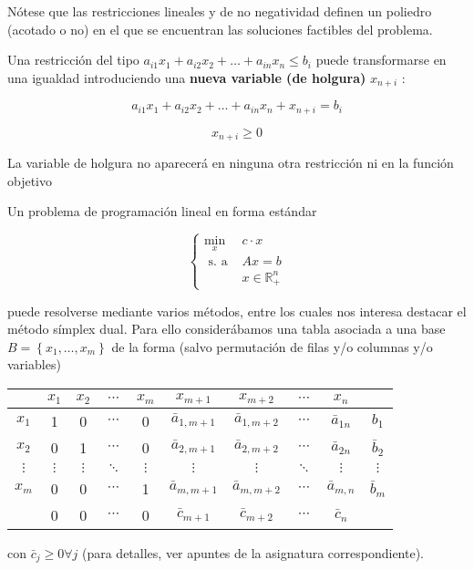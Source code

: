 \documentclass[openany]{book}
\begin{document}
Nótese que las restricciones lineales y de no negatividad definen un poliedro (acotado o no) en el que se encuentran las soluciones factibles del problema.

Una restricción del tipo $a_{i 1} x_{1}+a_{i 2} x_{2}+\ldots+a_{i n} x_{n} \leq b_{i}$ puede transformarse en una igualdad introduciendo una \textbf{nueva variable (de holgura)} $x_{n+i}$ :

$$
a_{i 1} x_{1}+a_{i 2} x_{2}+\ldots+a_{i n} x_{n}+x_{n+i}=b_{i}
$$

$$
x_{n+i} \geq 0
$$

La variable de holgura no aparecerá en ninguna otra restricción ni en la función objetivo

Un problema de programación lineal en forma estándar

$$
\begin{cases}\min _{x} & c \cdot x \\ \text { s. a } & A x=b \\ \quad & x \in \mathbb{R}_{+}^{n}\end{cases}
$$

puede resolverse mediante varios métodos, entre los cuales nos interesa destacar el método símplex dual. Para ello considerábamos una tabla asociada a una base $B=\left\{x_{1}, \ldots, x_{m}\right\}$ de la forma (salvo permutación de filas y/o columnas y/o variables)

\begin{tabular}{c|cccccccc|c}
\hline & $x_{1}$ & $x_{2}$ & $\cdots$ & $x_{m}$ & $x_{m+1}$ & $x_{m+2}$ & $\cdots$ & $x_{n}$ & \\
\hline$x_{1}$ & 1 & 0 & $\cdots$ & 0 & $\bar{a}_{1, m+1}$ & $\bar{a}_{1, m+2}$ & $\cdots$ & $\bar{a}_{1 n}$ & $b_{1}$ \\
$x_{2}$ & 0 & 1 & $\cdots$ & 0 & $\bar{a}_{2, m+1}$ & $\bar{a}_{2, m+2}$ & $\cdots$ & $\bar{a}_{2 n}$ & $\bar{b}_{2}$ \\
$\vdots$ & $\vdots$ & $\vdots$ & $\ddots$ & $\vdots$ & $\vdots$ & $\vdots$ & $\ddots$ & $\vdots$ & $\vdots$ \\
$x_{m}$ & 0 & 0 & $\cdots$ & 1 & $\bar{a}_{m, m+1}$ & $\bar{a}_{m, m+2}$ & $\cdots$ & $\bar{a}_{m, n}$ & $\bar{b}_{m}$ \\
\hline & 0 & 0 & $\cdots$ & 0 & $\bar{c}_{m+1}$ & $\bar{c}_{m+2}$ & $\cdots$ & $\bar{c}_{n}$ & \\
\hline
\end{tabular}

con $\bar{c}_{j} \geq 0 \forall j$ (para detalles, ver apuntes de la asignatura correspondiente).
\end{document}
